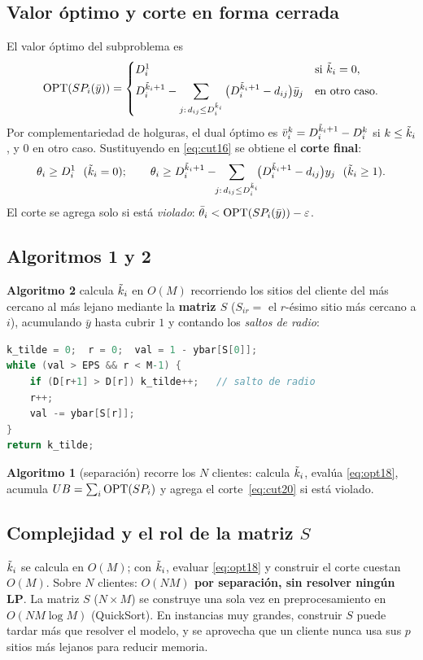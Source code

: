 \subsection{Valor óptimo y corte en forma cerrada}
El valor óptimo del subproblema es
\begin{equation}
  \mathrm{OPT}(SP_i(\bar y))=\begin{cases}
    D^1_i & \text{si } \tilde{k}_i=0,\\[4pt]
    D^{\tilde{k}_i+1}_i - \displaystyle\sum_{j:\,d_{ij}\le D^{\tilde{k}_i}_i}\big(D^{\tilde{k}_i+1}_i-d_{ij}\big)\bar y_j & \text{en otro caso.}
  \end{cases}
  \label{eq:opt18}
\end{equation}
Por complementariedad de holguras, el dual óptimo es
$\bar v^k_i = D^{\tilde{k}_i+1}_i-D^k_i$ si $k\le\tilde{k}_i$, y $0$ en otro caso. Sustituyendo en
\eqref{eq:cut16} se obtiene el \textbf{corte final}:
\begin{equation}
  \theta_i\ge D^1_i\ \ (\tilde{k}_i=0);\qquad
  \theta_i\ge D^{\tilde{k}_i+1}_i-\!\!\sum_{j:\,d_{ij}\le D^{\tilde{k}_i}_i}\!\!\big(D^{\tilde{k}_i+1}_i-d_{ij}\big)y_j\ \ (\tilde{k}_i\ge1).
  \label{eq:cut20}
\end{equation}
El corte se agrega solo si está \emph{violado}: $\bar\theta_i < \mathrm{OPT}(SP_i(\bar y))-\varepsilon$.

\subsection{Algoritmos 1 y 2}
\textbf{Algoritmo 2} calcula $\tilde{k}_i$ en $O(M)$ recorriendo los sitios del cliente del más cercano
al más lejano mediante la \textbf{matriz $S$} ($S_{ir}=$ el $r$-ésimo sitio más cercano a $i$),
acumulando $\bar y$ hasta cubrir $1$ y contando los \emph{saltos de radio}:
\begin{lstlisting}[language=C,numbers=none]
k_tilde = 0;  r = 0;  val = 1 - ybar[S[0]];
while (val > EPS && r < M-1) {
    if (D[r+1] > D[r]) k_tilde++;   // salto de radio
    r++;
    val -= ybar[S[r]];
}
return k_tilde;
\end{lstlisting}
\textbf{Algoritmo 1} (separación) recorre los $N$ clientes: calcula $\tilde{k}_i$, evalúa
\eqref{eq:opt18}, acumula $UB=\sum_i\mathrm{OPT}(SP_i)$ y agrega el corte~\eqref{eq:cut20} si está
violado.

\subsection{Complejidad y el rol de la matriz \texorpdfstring{$S$}{S}}
$\tilde{k}_i$ se calcula en $O(M)$; con $\tilde{k}_i$, evaluar \eqref{eq:opt18} y construir el corte cuestan
$O(M)$. Sobre $N$ clientes: \textbf{$O(NM)$ por separación, sin resolver ningún LP}. La matriz $S$
($N\times M$) se construye una sola vez en preprocesamiento en $O(NM\log M)$ (QuickSort). En
instancias muy grandes, construir $S$ puede tardar más que resolver el modelo, y se aprovecha que
un cliente nunca usa sus $p$ sitios más lejanos para reducir memoria.

